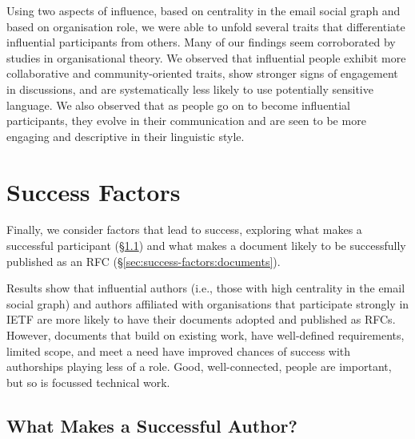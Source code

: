 \documentclass[twocolumn,10pt]{article}
\newcommand{\pb}[1]{\vspace{0.75ex}\noindent{\textbf{#1}}}
\begin{document}
\pb{Summary:}
Using two aspects of influence, based on centrality in the email social
graph and based on organisation role, we were able to unfold several
traits that differentiate influential participants from others. Many
of our findings seem corroborated by studies in organisational theory.
We observed that influential people exhibit more collaborative and
community-oriented traits, show stronger signs of engagement in
discussions, and are systematically less likely to use potentially
sensitive language.
We also observed that as people go on to become influential participants,
they evolve in their communication and are seen to be more engaging and
descriptive in their linguistic style. 


\section{Success Factors}
\label{sec:success-factors}

Finally, we consider factors that lead to success, exploring what makes a
successful participant (\S\ref{sec:success-factors:authors}) and what makes
a document likely to be successfully published as an RFC (\S\ref{sec:success-factors:documents}).

Results show that influential authors (i.e., those with high centrality in
the email social graph) and authors affiliated with organisations that
participate strongly in IETF are more likely to have their documents
adopted and published as RFCs. However, documents that build on existing
work, have well-defined requirements, limited scope, and meet a need have
improved chances of success with authorships playing less of a role. Good,
well-connected, people are important, but so is focussed technical work.

\subsection{What Makes a Successful Author?}
\label{sec:success-factors:authors}

\end{document}
